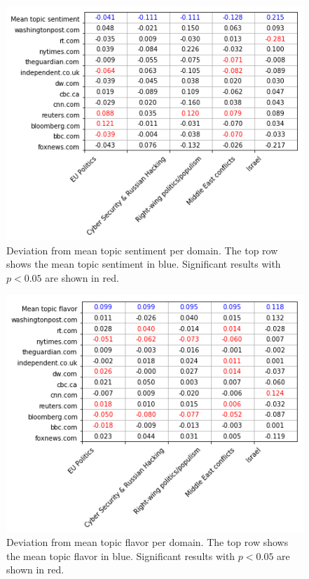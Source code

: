 \documentclass[final]{ieee}
\begin{document}

\begin{figure}[!hbt]
  
  \centering
    \includegraphics[width=\columnwidth]{mean_sent.png}
    \caption{Deviation from mean topic sentiment per domain. The top row shows the mean topic sentiment in blue. Significant results with $p < 0.05$ are shown in red.}
  \label{fig:mean_sent}
\end{figure}

\begin{figure}[!hbt]
  
  \centering
    \includegraphics[width=\columnwidth]{mean_flavor.png}
    \caption{Deviation from mean topic flavor per domain. The top row shows the mean topic flavor in blue. Significant results with $p < 0.05$ are shown in red.}
  \label{fig:mean_flavor}
\end{figure}
\end{document}
